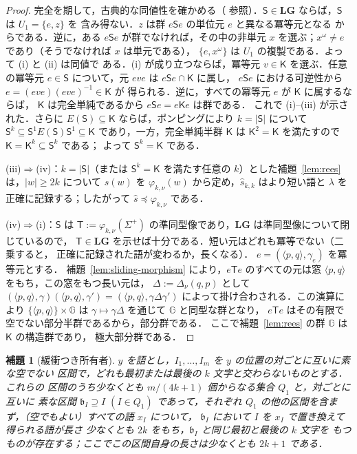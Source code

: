 \documentclass[11pt,a4paper]{ltjsarticle}
\numberwithin{equation}{section}
\theoremstyle{plain}
\newtheorem{lemma}[theorem]{補題}
\theoremstyle{definition}
\theoremstyle{remark}
\theoremstyle{plain}
\newcommand{\LG}{\mathbf{LG}}
\begin{document}
\begin{proof}
完全を期して，古典的な同値性を確かめる（\cite[命題~2.3]{AlmeidaEtAl2009}
参照）．$\mathsf S\in\LG$ ならば，$\mathsf S$ は $U_1=\{e,z\}$ を
含み得ない．$z$ は群 $e\mathsf Se$ の単位元 $e$ と異なる冪等元となる
からである．逆に，ある $e\mathsf Se$ が群でなければ，その中の非単元 $x$
を選ぶ；$x^\omega\ne e$ であり（そうでなければ $x$ は単元である），
$\{e,x^\omega\}$ は $U_1$ の複製である．よって (i) と (ii) は同値で
ある．(i) が成り立つならば，冪等元 $v\in\mathsf K$ を選ぶ．任意の冪等元
$e\in\mathsf S$ について，元 $eve$ は $e\mathsf Se\cap\mathsf K$ に属し，
$e\mathsf Se$ における可逆性から $e=(eve)(eve)^{-1}\in\mathsf K$ が
得られる．逆に，すべての冪等元 $e$ が $\mathsf K$ に属するならば，
$\mathsf K$ は完全単純であるから $e\mathsf Se=e\mathsf Ke$ は群である．
これで (i)--(iii) が示された．さらに $E(\mathsf S)\subseteq\mathsf K$
ならば，ポンピングにより $k=|\mathsf S|$ について
$\mathsf S^k\subseteq\mathsf S^1E(\mathsf S)\mathsf S^1\subseteq\mathsf K$
であり，一方，完全単純半群 $\mathsf K$ は $\mathsf K^2=\mathsf K$ を満たすので
$\mathsf K=\mathsf K^k\subseteq\mathsf S^k$ である；
よって $\mathsf S^k=\mathsf K$ である．

(iii)$\Rightarrow$(iv)：$k=|\mathsf S|$（または $\mathsf S^k=\mathsf K$
を満たす任意の $k$）とした補題~\ref{lem:rees} は，$|w|\ge2k$ について
$s(w)$ を $\varphi_{k,\nu}(w)$ から定め，$\widehat s_{k,k}$ はより短い語と
$\lambda$ を正確に記録する；したがって $\widehat s\preceq\varphi_{k,\nu}$
である．

(iv)$\Rightarrow$(i)：$\mathsf S$ は $\mathsf T:=\varphi_{k,\nu}(\Sigma^+)$
の準同型像であり，$\LG$ は準同型像について閉じているので，
$\mathsf T\in\LG$ を示せば十分である．短い元はどれも冪等でない（二乗すると，
正確に記録された語が変わるか，長くなる）．
$e=(\langle p,q\rangle,\gamma_e)$ を冪等元とする．
補題~\ref{lem:sliding-morphism} により，$e\mathsf Te$ のすべての元は窓
$\langle p,q\rangle$ をもち，この窓をもつ長い元は，
$\Delta:=\Delta_\nu(q,p)$ として
$(\langle p,q\rangle,\gamma)(\langle p,q\rangle,\gamma')=(\langle p,q\rangle,\gamma\Delta\gamma')$
によって掛け合わされる．この演算により $\{\langle p,q\rangle\}\times \mathbb G$
は $\gamma\mapsto\gamma\Delta$ を通じて $\mathbb G$ と同型な群となり，
$e\mathsf Te$ はその有限で空でない部分半群であるから，部分群である．
ここで補題~\ref{lem:rees} の群 $\mathbb G$ は $\mathsf K$ の構造群であり，
極大部分群である．
\end{proof}

\begin{lemma}[緩衝つき所有者]
\label{lem:buffered}
$y$ を語とし，$I_1,\ldots,I_m$ を $y$ の位置の対ごとに互いに素な空でない
区間で，どれも最初または最後の $k$ 文字と交わらないものとする．これらの
区間のうち少なくとも $m/(4k+1)$ 個からなる集合 $Q_1$ と，対ごとに互いに
素な区間 $\mathfrak b_I\supseteq I$ $(I\in Q_1)$ であって，それぞれ
$Q_1$ の他の区間を含まず，（空でもよい）すべての語 $x_I$ について，
$\mathfrak b_I$ において $I$ を $x_I$ で置き換えて得られる語が長さ
少なくとも $2k$ をもち，$\mathfrak b_I$ と同じ最初と最後の $k$ 文字を
もつものが存在する；ここでこの区間自身の長さは少なくとも
$2k+1$ である．
\end{lemma}
\end{document}
